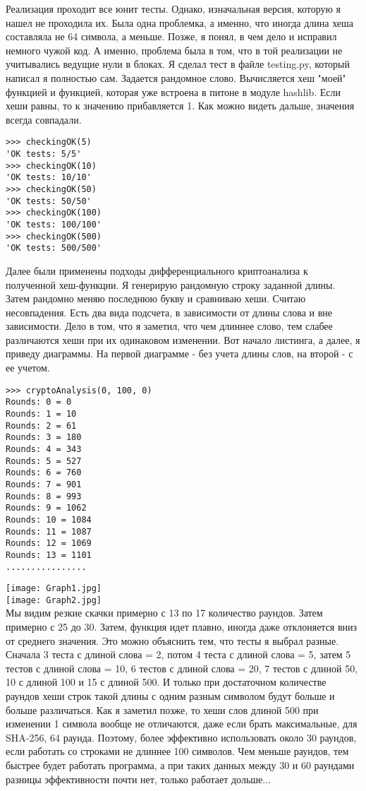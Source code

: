 \documentclass[12pt]{article}
\begin{document}
\par
Реализация проходит все юнит тесты. Однако, изначальная версия, которую я нашел не проходила их. Была одна проблемка, а именно, что иногда длина хеша составляла не 64 символа, а меньше. Позже, я понял, в чем дело и исправил немного чужой код. А именно, проблема была в том, что в той реализации не учитывались ведущие нули в блоках. Я сделал тест в файле testing.py, который написал я полностью сам. Задается рандомное слово. Вычисляется хеш "моей" функцией и функцией, которая уже встроена в питоне в модуле hashlib. Если хеши равны, то к значению прибавляется 1. Как можно видеть дальше, значения всегда совпадали. \par
\begin{verbatim}
>>> checkingOK(5)  
'OK tests: 5/5'  
>>> checkingOK(10)  
'OK tests: 10/10'  
>>> checkingOK(50)  
'OK tests: 50/50'  
>>> checkingOK(100)  
'OK tests: 100/100'  
>>> checkingOK(500)  
'OK tests: 500/500'  
\end{verbatim}
\par
Далее были применены подходы дифференциального криптоанализа к полученной хеш-функции. Я генерирую рандомную строку заданной длины. Затем рандомно меняю последнюю букву и сравниваю хеши. Считаю несовпадения. Есть два вида подсчета, в зависимости от длины слова и вне зависимости. Дело в том, что я заметил, что чем длиннее слово, тем слабее различаются хеши при их одинаковом изменении. Вот начало листинга, а далее, я приведу диаграммы. На первой диаграмме - без учета длины слов, на второй - с ее учетом.\par
\begin{verbatim}
>>> cryptoAnalysis(0, 100, 0)
Rounds: 0 = 0
Rounds: 1 = 10
Rounds: 2 = 61
Rounds: 3 = 180
Rounds: 4 = 343
Rounds: 5 = 527
Rounds: 6 = 760
Rounds: 7 = 901
Rounds: 8 = 993
Rounds: 9 = 1062
Rounds: 10 = 1084
Rounds: 11 = 1087
Rounds: 12 = 1069
Rounds: 13 = 1101
................
\end{verbatim}

\texttt{[image: Graph1.jpg]}\\
\texttt{[image: Graph2.jpg]}\\

Мы видим резкие скачки примерно с 13 по 17 количество раундов. Затем примерно с 25 до 30. Затем, функция идет плавно, иногда даже отклоняется вниз от среднего значения. Это можно объяснить тем, что тесты я выбрал разные. Сначала 3 теста с длиной слова = 2, потом 4 теста с длиной слова = 5, затем 5 тестов с длиной слова = 10, 6 тестов с длиной слова = 20, 7 тестов с длиной 50, 10 с длиной 100 и 15 с длиной 500. И только при достаточном количестве раундов хеши строк такой длины с одним разным символом будут больше и больше различаться. Как я заметил позже, то хеши слов длиной 500 при изменении 1 символа вообще не отличаются, даже если брать максимальные, для SHA-256, 64 раунда. Поэтому, более эффективно использовать около 30 раундов, если работать со строками не длиннее 100 символов. Чем меньше раундов, тем быстрее будет работать программа, а при таких данных между 30 и 60 раундами разницы эффективности почти нет, только работает дольше...
\end{document}
